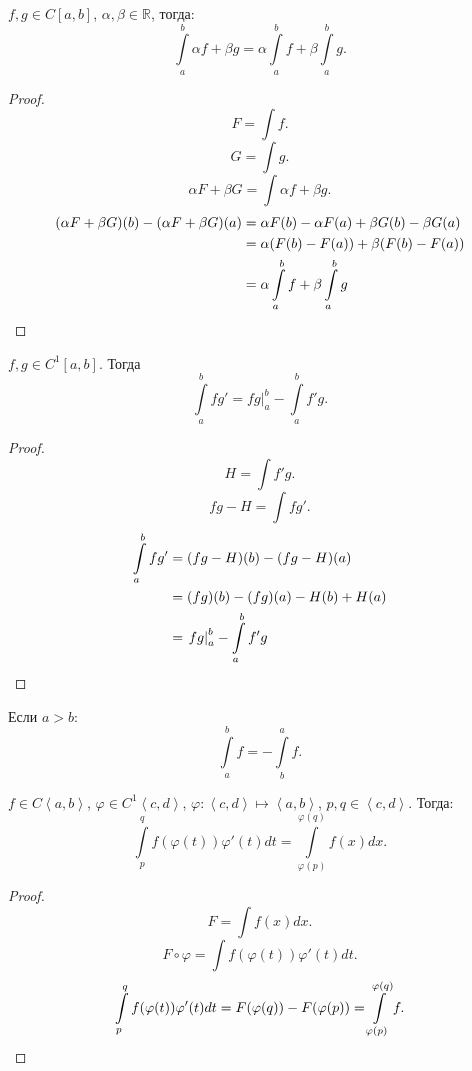 \documentclass[11pt, oneside]{article}   	%
\begin{document}
   \begin{tlemma}
       $f, g\in C[a, b]$, $\alpha, \beta\in \mathbb{R}$, тогда:
       \[ \int\limits_{a}^{b} \alpha f + \beta g = \alpha \int\limits_{a}^{b} f + \beta \int\limits_{a}^{b} g    .\]
       \begin{proof}
           \[ F = \int f .\]
           \[ G = \int g .\]
           \[ \alpha F + \beta G = \int \alpha f + \beta g .\]
            \begin{equation*}
                \begin{split}
                    (\alpha F + \beta G)(b) - (\alpha F + \beta G)(a) 
                    &= \alpha F(b) - \alpha F(a) + \beta G(b) - \beta G(a)\\ 
                    &= \alpha(F(b)-F(a)) + \beta(F(b)-F(a))\\ 
                    &= \alpha\int\limits_{a}^{b} f + \beta\int\limits_{a}^{b} g \qedhere
                \end{split}
            \end{equation*}
       \end{proof}
   \end{tlemma}
   \begin{tlemma}
       $f, g\in C^{1}[a,b]$. Тогда
       \[ \int\limits_{a}^{b} fg' = \left. fg\right|_{a}^{b} - \int\limits_{a}^{b} f'g   .\]
        \begin{proof}
            \[ H = \int f'g .\]
            \[ fg - H = \int fg' .\]
            \begin{equation*}
                \begin{split}
                    \int\limits_{a}^{b} fg' 
                    &= (fg-H)(b)-(fg-H)(a)\\ 
                    &= (fg)(b)-(fg)(a) - H(b)+H(a)\\ 
                    &= \left.fg\right|_{a}^{b} - \int\limits_{a}^{b} f'g \qedhere 
                \end{split}
            \end{equation*}
        \end{proof}
   \end{tlemma}
   \begin{definition}
       Если $a>b$:
       \[ \int\limits_{a}^{b} f = - \int\limits_{b}^{a} f   .\] 
   \end{definition}
   \begin{tlemma}
       $f\in C\left<a, b\right>$, $\varphi\in C^{1}\left<c, d\right>$, $\varphi : \left<c, d\right> \mapsto \left<a, b\right>$, $p,q\in \left<c, d\right>$. Тогда:
       \[ \int\limits_{p}^{q} f(\varphi(t))\varphi'(t)dt = \int\limits_{\varphi(p)}^{\varphi(q)} f(x)dx   .\]
       \begin{proof}
           \[ F = \int f(x) dx .\]
           \[ F \circ \varphi = \int f(\varphi(t))\varphi'(t) dt.\]
           \[ \int\limits_{p}^{q} f(\varphi(t))\varphi'(t)dt = F(\varphi(q))-F(\varphi(p)) = \int\limits_{\varphi(p)}^{\varphi(q)} f   .\qedhere\] 
       \end{proof}
   \end{tlemma}
\end{document}
